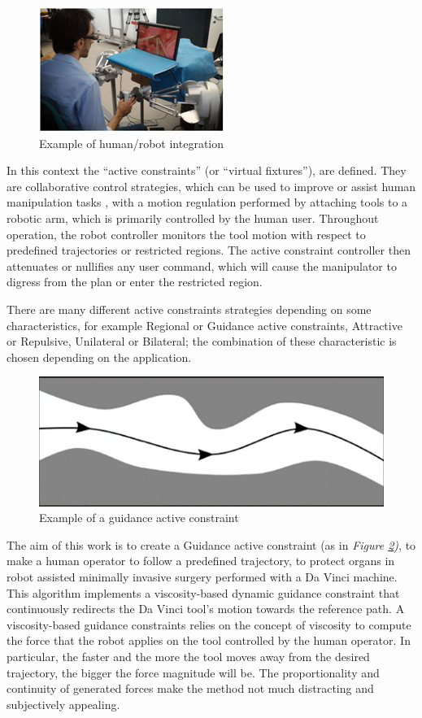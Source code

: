 \documentclass[conference]{IEEEtran}
\begin{document}
\begin{figure}[h!]
    \centering
    \includegraphics{intro1.png}
    \caption{Example of human/robot integration}
    \label{fig:intro1}
\end{figure}

In this context the “active constraints” (or “virtual fixtures”), are
defined. They are collaborative control strategies, which can be used
to improve or assist human manipulation tasks \cite{acvf}, with a
motion regulation performed by attaching tools to a robotic arm, which
is primarily controlled by the human user. Throughout operation, the
robot controller monitors the tool motion with respect to predefined
trajectories or restricted regions. The active constraint controller
then attenuates or nullifies any user command, which will cause the
manipulator to digress from the plan or enter the restricted region.

There are many different active constraints strategies depending on
some characteristics, for example Regional or Guidance active
constraints, Attractive or Repulsive, Unilateral or
Bilateral\cite{acvf}; the combination of these characteristic is
chosen depending on the application. 

\begin{figure}[h]
    \centering
    \includegraphics{intro2.png}
    \caption{Example of a guidance active constraint}
    \label{fig:intro2}
\end{figure}
The aim of this work is to create a Guidance active constraint (as in
\textit{Figure \ref{fig:intro2})}, to make a human operator to follow
a predefined trajectory, to protect organs in robot assisted minimally
invasive surgery performed with a Da Vinci machine. This algorithm
implements a viscosity-based dynamic guidance constraint that
continuously redirects the Da Vinci tool’s motion towards the
reference path. A viscosity-based guidance constraints relies on the
concept of viscosity to compute the force that the robot applies on
the tool controlled by the human operator. In particular, the faster
and the more the tool moves away from the desired trajectory, the
bigger the force magnitude will be. The proportionality and continuity
of generated forces make the method not much distracting and
subjectively appealing.
\end{document}
